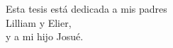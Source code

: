\begin{flushright}
\null{}
Esta tesis está dedicada a mis padres\\ Lilliam y Elier,\\ y a mi hijo Josué.
\null
\end{flushright}
